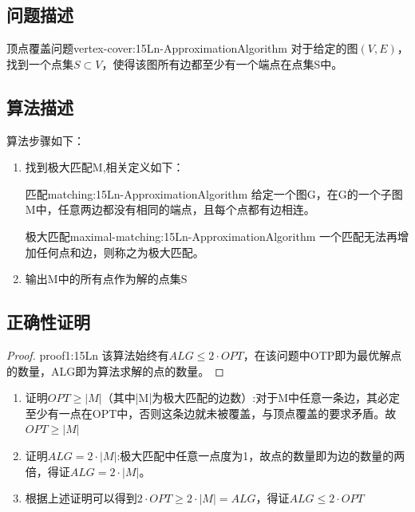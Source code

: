 \subsection{问题描述}

\begin{definition}{顶点覆盖问题}{vertex-cover:15Ln-ApproximationAlgorithm}
	对于给定的图$(V,E)$，找到一个点集$S\subset V$，使得该图所有边都至少有一个端点在点集S中。
\end{definition}

\subsection{算法描述}

算法步骤如下：
\begin{enumerate}
	\item 找到极大匹配M,相关定义如下：
	\begin{definition}{匹配}{matching:15Ln-ApproximationAlgorithm}
		给定一个图G，在G的一个子图M中，任意两边都没有相同的端点，且每个点都有边相连。
	\end{definition}
	\begin{definition}{极大匹配}{maximal-matching:15Ln-ApproximationAlgorithm}
		一个匹配无法再增加任何点和边，则称之为极大匹配。
	\end{definition}
	\item 输出M中的所有点作为解的点集S
\end{enumerate}

\subsection{正确性证明}

\begin{proof}{}{proof1:15Ln}
该算法始终有$ALG\leqslant 2\cdot OPT$，在该问题中OTP即为最优解点的数量，ALG即为算法求解的点的数量。
\end{proof}
\begin{enumerate}
	\item 证明$OPT\geqslant |M|$（其中|M|为极大匹配的边数）:对于M中任意一条边，其必定至少有一点在OPT中，否则这条边就未被覆盖，与顶点覆盖的要求矛盾。故$OPT\geqslant |M|$
	\item 证明$ALG=2\cdot |M|$:极大匹配中任意一点度为1，故点的数量即为边的数量的两倍，得证$ALG=2\cdot |M|$。
	\item 根据上述证明可以得到$2\cdot OPT\geqslant 2\cdot|M|=ALG$，得证$ALG\leqslant 2\cdot OPT$
\end{enumerate}
	
